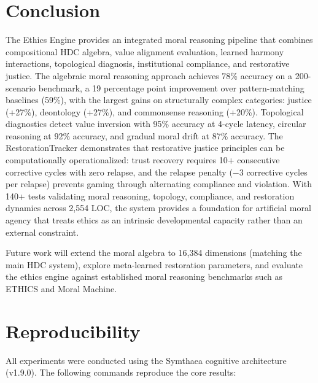 \documentclass[11pt,a4paper]{article}
\begin{document}
\section{Conclusion}

The Ethics Engine provides an integrated moral reasoning pipeline that combines compositional HDC algebra, value alignment evaluation, learned harmony interactions, topological diagnosis, institutional compliance, and restorative justice. The algebraic moral reasoning approach achieves 78\% accuracy on a 200-scenario benchmark, a 19 percentage point improvement over pattern-matching baselines (59\%), with the largest gains on structurally complex categories: justice (+27\%), deontology (+27\%), and commonsense reasoning (+20\%). Topological diagnostics detect value inversion with 95\% accuracy at 4-cycle latency, circular reasoning at 92\% accuracy, and gradual moral drift at 87\% accuracy. The RestorationTracker demonstrates that restorative justice principles can be computationally operationalized: trust recovery requires 10+ consecutive corrective cycles with zero relapse, and the relapse penalty ($-3$ corrective cycles per relapse) prevents gaming through alternating compliance and violation. With 140+ tests validating moral reasoning, topology, compliance, and restoration dynamics across 2,554 LOC, the system provides a foundation for artificial moral agency that treats ethics as an intrinsic developmental capacity rather than an external constraint.

Future work will extend the moral algebra to 16,384 dimensions (matching the main HDC system), explore meta-learned restoration parameters, and evaluate the ethics engine against established moral reasoning benchmarks such as ETHICS and Moral Machine.

\section{Reproducibility}

All experiments were conducted using the Symthaea cognitive architecture (v1.9.0). The following commands reproduce the core results:
\end{document}

